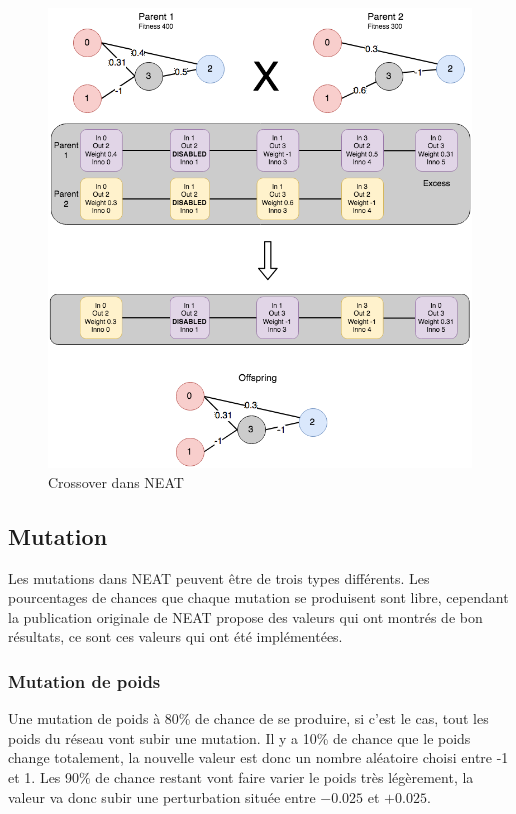 \documentclass{article}
\begin{document}
\begin{figure}[H]
\begin{center}
	\includegraphics[scale=0.5]{crossoverneat.png}
	\caption{Crossover dans NEAT}
\end{center}
\end{figure}

\subsection{Mutation}

Les mutations dans NEAT peuvent être de trois types différents. Les pourcentages de chances que chaque mutation se produisent sont libre, cependant la publication originale de NEAT propose des valeurs qui ont montrés de bon résultats, ce sont ces valeurs qui ont été implémentées.

\subsubsection{Mutation de poids}

Une mutation de poids à 80\% de chance de se produire, si c'est le cas, tout les poids du réseau vont subir une mutation. Il y a 10\% de chance que le poids change totalement, la nouvelle valeur est donc un nombre aléatoire choisi entre -1 et 1. Les 90\% de chance restant vont faire varier le poids très légèrement, la valeur va donc subir une perturbation située entre $-0.025$ et $+0.025$.
\end{document}
